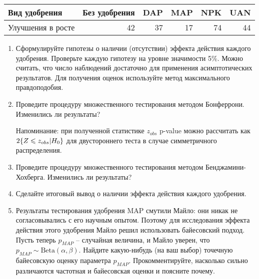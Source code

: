 \documentclass[10pt, a4paper]{extarticle}
\let\P\relax
\DeclareMathOperator{\P}{\mathbb{P}}
\renewcommand{\le}{\leqslant}
\begin{document}
	\begin{center}
	\begin{tabular}{lrrrrr}
		Вид удобрения      & Без удобрения & DAP & MAP & NPK & UAN \\
		\hline
		Улучшения в росте  & 42		   & 37  & 17  & 74  & 44 \\
	\end{tabular}
	\end{center}

	\begin{enumerate}[label = \alph*)]
		\item Сформулируйте гипотезы о наличии (отсутствии) эффекта действия каждого удобрения. Проверьте каждую гипотезу на уровне значимости 5\%. Можно считать, что число наблюдений достаточно для применения асимптотических результатов. Для получения оценок используйте метод максимального правдоподобия.
		\item Проведите процедуру множественного тестирования методом Бонферрони.
		Изменились ли результаты? 
		
		Напоминание: при полученной статистике $z_{obs}$ p-value можно рассчитать как $2\P\{Z \le z_{obs} | H_0\}$ для двустороннего теста в случае симметричного распределения.
		
		\item Проведите процедуру множественного тестирования методом Бенджамини-Хохберга. Изменились ли результаты? 
		\item Сделайте итоговый вывод о наличии эффекта действия каждого удобрения.
		
		\item Результаты тестирования удобрения MAP смутили Майло: они никак не согласовывались с его научным опытом. Поэтому для исследования эффекта действия этого удобрения Майло решил использовать байесовский подход. Пусть теперь $p_{MAP}$ -- случайная величина, и Майло уверен, что $p_{MAP} \sim \mathrm{Beta}(\alpha, \beta)$. Найдите какую-нибудь (на ваш выбор) точечную байесовскую оценку параметра $p_{MAP}$. Прокомментируйте, насколько сильно различаются частотная и байесовская оценки и поясните почему.
	\end{enumerate}
	
\end{document}
